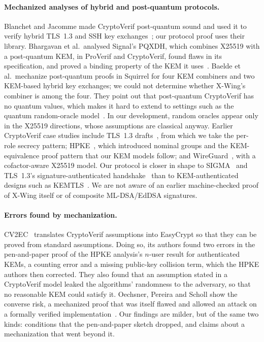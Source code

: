 \paragraph{Mechanized analyses of hybrid and post-quantum protocols.}
Blanchet and Jacomme made CryptoVerif post-quantum sound and used it to
verify hybrid TLS~1.3 and SSH key exchanges~\cite{BJ24}; our protocol proof
uses their library. Bhargavan et al.\ analysed Signal's PQXDH, which
combines X25519 with a post-quantum KEM, in ProVerif and CryptoVerif, found
flaws in its specification, and proved a binding property of the KEM it
uses~\cite{BJKS24}. Baelde et al.\ mechanize post-quantum proofs in Squirrel
for four KEM combiners and two KEM-based hybrid key exchanges; we could not
determine whether X-Wing's combiner is among the four. They point
out that post-quantum CryptoVerif has no quantum values, which makes it hard
to extend to settings such as the quantum random-oracle
model~\cite{BDDJK26}. In our development, random oracles appear only in the
X25519 directions, whose assumptions are classical anyway. Earlier CryptoVerif case studies
include TLS~1.3 drafts~\cite{BBK17}, from which we take the per-role secrecy
pattern; HPKE~\cite{ABHKLR21}, which introduced nominal groups and the
KEM-equivalence proof pattern that our KEM models follow; and
WireGuard~\cite{LBB19}, with a cofactor-aware X25519 model. Our protocol is
closer in shape to SIGMA~\cite{Kra03} and TLS~1.3's signature-authenticated
handshake~\cite{DFGS21} than to KEM-authenticated designs such as
KEMTLS~\cite{SSW20}. We are not aware of an earlier machine-checked proof of
X-Wing itself or of composite ML-DSA/EdDSA signatures.

\paragraph{Errors found by mechanization.} CV2EC~\cite{CV2EC} translates
CryptoVerif assumptions into EasyCrypt so that they can be proved from
standard assumptions. Doing so, its authors found two errors in the
pen-and-paper proof of the HPKE analysis's $n$-user result for authenticated
KEMs, a counting error and a missing public-key collision term, which the
HPKE authors then corrected. They also found that an assumption stated in a
CryptoVerif model leaked the algorithms' randomness to the adversary, so
that no reasonable KEM could satisfy it. Oechsner, Pereira and Scholl show
the converse risk, a mechanized proof that was itself flawed and allowed an
attack on a formally verified implementation~\cite{OPS25}. Our findings are
milder, but of the same two kinds: conditions that the pen-and-paper sketch
dropped, and claims about a mechanization that went beyond it.

